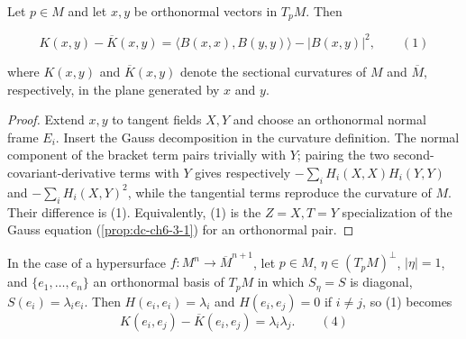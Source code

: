 \begin{theorem}[Gauss]
  \label{thm:dc-ch6-2-5}


  Let $p\in M$ and let $x,y$ be orthonormal vectors in $T_pM$. Then

  $$
  K(x,y)-\overline{K}(x,y)=\langle B(x,x),B(y,y)\rangle-|B(x,y)|^2,\qquad(1)
  $$

  where $K(x,y)$ and $\overline{K}(x,y)$ denote the sectional curvatures of $M$ and
  $\overline{M}$, respectively, in the plane generated by $x$ and $y$.
\end{theorem}
\begin{proof}

  \sketch
  Extend $x,y$ to tangent fields $X,Y$ and choose an orthonormal normal frame
  $E_i$. Insert the Gauss decomposition in the curvature definition. The normal
  component of the bracket term pairs trivially with $Y$; pairing the two
  second-covariant-derivative terms with $Y$ gives respectively
  $-\sum_iH_i(X,X)H_i(Y,Y)$ and $-\sum_iH_i(X,Y)^2$, while the tangential
  terms reproduce the curvature of $M$. Their difference is (1). Equivalently,
  (1) is the $Z=X,T=Y$ specialization of the Gauss equation
  (\cref{prop:dc-ch6-3-1}) for an orthonormal pair.
\end{proof}

\begin{remark}
  \label{rem:dc-ch6-2-6}


  In the case of a hypersurface $f:M^n\to\overline{M}^{n+1}$, let $p\in M$,
  $\eta\in(T_pM)^\perp$, $|\eta|=1$, and $\{e_1,\dots,e_n\}$ an orthonormal basis of $T_pM$ in
  which $S_\eta=S$ is diagonal, $S(e_i)=\lambda_ie_i$. Then $H(e_i,e_i)=\lambda_i$
  and $H(e_i,e_j)=0$ if $i\neq j$, so (1) becomes
  $$
  K(e_i,e_j)-\overline{K}(e_i,e_j)=\lambda_i\lambda_j.\qquad(4)
  $$
\end{remark}

